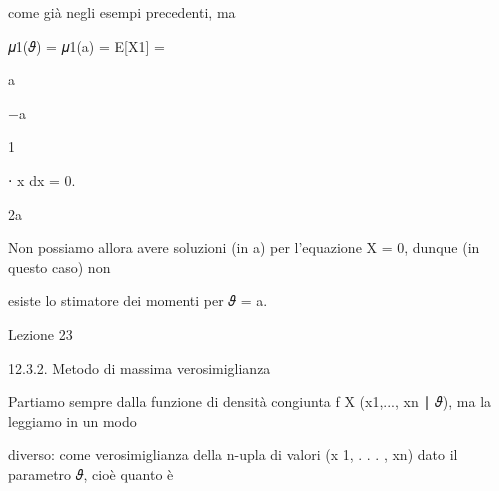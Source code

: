 \documentclass[a4paper,portrait,12pt]{article}
\begin{document}
\begin{flushleft}
come gi\`{a} negli esempi precedenti, ma
\end{flushleft}


\begin{flushleft}
𝜇1(𝜗) = 𝜇1(a) = E[X1] =
\end{flushleft}





\begin{flushleft}
a
\end{flushleft}


\begin{flushleft}
$-$a
\end{flushleft}





1


\begin{flushleft}
⋅ x dx = 0.
\end{flushleft}


\begin{flushleft}
2a
\end{flushleft}





\begin{flushleft}
Non possiamo allora avere soluzioni (in a) per l'equazione X = 0, dunque (in questo caso) non
\end{flushleft}


\begin{flushleft}
esiste lo stimatore dei momenti per 𝜗 = a.
\end{flushleft}


\begin{flushleft}
Lezione 23
\end{flushleft}





\begin{flushleft}
12.3.2. Metodo di massima verosimiglianza
\end{flushleft}


\begin{flushleft}
Partiamo sempre dalla funzione di densit\`{a} congiunta f X (x1,..., xn ∣ 𝜗), ma la leggiamo in un modo
\end{flushleft}


\begin{flushleft}
diverso: come verosimiglianza della n-upla di valori (x 1, . . . , xn) dato il parametro 𝜗, cio\`{e} quanto \`{e}
\end{flushleft}
\end{document}

